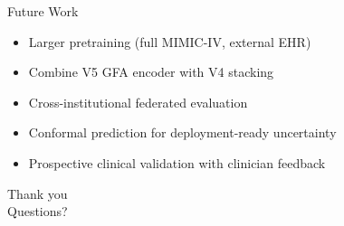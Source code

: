 \documentclass[aspectratio=169,11pt]{beamer}
\begin{document}
\begin{frame}{Future Work}
\begin{itemize}
\item Larger pretraining (full MIMIC-IV, external EHR)
\item Combine V5 GFA encoder with V4 stacking
\item Cross-institutional federated evaluation
\item Conformal prediction for deployment-ready uncertainty
\item Prospective clinical validation with clinician feedback
\end{itemize}
\end{frame}

\begin{frame}
\centering
\Large Thank you\\
\vspace{1em}
Questions?
\end{frame}
\end{document}
